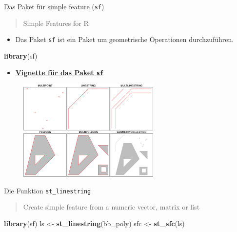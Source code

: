 \documentclass[ignorenonframetext,]{beamer}
\newenvironment{Shaded}{\begin{snugshade}}{\end{snugshade}}
\newcommand{\KeywordTok}[1]{\textcolor[rgb]{0.13,0.29,0.53}{\textbf{#1}}}
\newcommand{\StringTok}[1]{\textcolor[rgb]{0.31,0.60,0.02}{#1}}
\newcommand{\NormalTok}[1]{#1}
\providecommand{\tightlist}{%
  \setlength{\itemsep}{0pt}\setlength{\parskip}{0pt}}
\begin{document}
\begin{frame}[fragile]{Das Paket für simple feature (\texttt{sf})}

\begin{quote}
Simple Features for R
\end{quote}

\begin{itemize}
\tightlist
\item
  Das Paket \texttt{sf} ist ein Paket um geometrische Operationen
  durchzuführen.
\end{itemize}

\begin{Shaded}
\begin{Highlighting}[]
\KeywordTok{library}\NormalTok{(sf)}
\end{Highlighting}
\end{Shaded}

\begin{itemize}
\tightlist
\item
  \href{https://cran.r-project.org/web/packages/sf/vignettes/sf3.html}{\textbf{Vignette
  für das Paket \texttt{sf}}}
\end{itemize}

\begin{figure}
\centering
\includegraphics{figure/rsimplefeatures.png}
\caption{}
\end{figure}

\end{frame}

\begin{frame}[fragile]{Die Funktion \texttt{st\_linestring}}

\begin{quote}
Create simple feature from a numeric vector, matrix or list
\end{quote}

\begin{Shaded}
\begin{Highlighting}[]
\KeywordTok{library}\NormalTok{(sf)}
\NormalTok{ls <-}\StringTok{ }\KeywordTok{st_linestring}\NormalTok{(bb_poly)}
\NormalTok{sfc <-}\StringTok{ }\KeywordTok{st_sfc}\NormalTok{(ls)}
\end{Highlighting}
\end{Shaded}

\end{frame}
\end{document}
